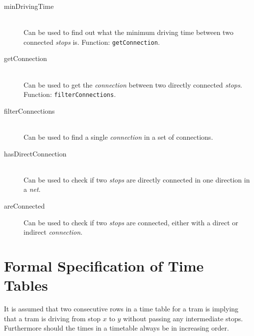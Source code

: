 \documentclass[a4]{article}
\begin{document}
\begin{description}
    \item[minDrivingTime] \hfill \\ Can be used to find out what the minimum driving time between two connected \emph{stops} is. Function: \verb=getConnection=.
    \item[getConnection] \hfill \\ Can be used to get the \emph{connection} between two directly connected \emph{stops}. Function: \verb=filterConnections=.
    \item[filterConnections] \hfill \\ Can be used to find a single \emph{connection} in a set of connections.
    \item[hasDirectConnection] \hfill \\ Can be used to check if two \emph{stops} are directly connected in one direction in a \emph{net}.
    \item[areConnected] Can be used to check if two \emph{stops} are connected, either with a direct or indirect \emph{connection}.
\end{description}  

\section{Formal Specification of Time Tables}



It is assumed that two consecutive rows in a time table for a tram is implying that a tram is driving from stop $x$ to $y$ without passing any intermediate stops. Furthermore should the times in a timetable always be in increasing order.
\end{document}
